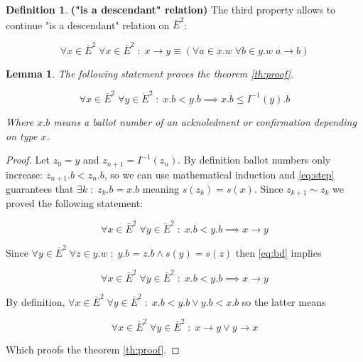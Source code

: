 \documentclass[12pt]{article}
\newtheorem{lemma}[theorem]{Lemma}
\theoremstyle{definition}
\newtheorem*{definition}{Definition}
\begin{document}
\begin{appendices}
\begin{definition}{\bf("is a descendant" relation)}
  The third property allows to continue "is a descendant" relation on $\bar{E}^2$:
  
  \begin{equation}
    \forall x \in \bar{E}^2 \; \forall x \in \bar{E}^2 \;:\; x \to y \equiv (\forall a \in x.w \; \forall b \in y.w \; a \to b)
  \end{equation}
\end{definition}

\begin{lemma}
  The following statement proves the theorem \ref{th:proof}.

  \begin{equation} \label{eq:step}
    \forall x \in \bar{E}^2 \; \forall y \in \ddot{E}^2 \;:\; x.b < y.b \implies x.b \leq I^{-1}(y).b
  \end{equation}

  Where $x.b$ means a ballot number of an acknoledment or confirmation depending on type $x$.
\end{lemma}

\begin{proof}
  Let $z_0 = y$ and $z_{n+1} = I^{-1}(z_{n})$. By definition ballot numbers only increase: $z_{n+1}.b < z_{n}.b$, so we can use mathematical induction and \ref{eq:step} guarantees that $\exists k \;:\; z_k.b = x.b$ meaning $s(z_k) = s(x)$. Since $z_{k+1} \sim z_k$ we proved the following statement:

  \begin{equation} \label{eq:bd}
    \forall x \in \bar{E}^2 \; \forall y \in \ddot{E}^2 \;:\; x.b < y.b \implies x \to y
  \end{equation}

  Since $\forall y \in \bar{E}^2 \; \forall z \in y.w \;:\; y.b=z.b \land s(y)=s(z)$ then \ref{eq:bd} implies

  \begin{equation}
    \forall x \in \bar{E}^2 \; \forall y \in \bar{E}^2 \;:\; x.b < y.b \implies x \to y
  \end{equation}

  By definition, $\forall x \in \bar{E}^2 \; \forall y \in \bar{E}^2 \;:\; x.b < y.b \lor y.b < x.b$ so the latter means

  \begin{equation}
    \forall x \in \bar{E}^2 \; \forall y \in \bar{E}^2 \;:\; x \to y \lor y \to x
  \end{equation}

  Which proofs the theorem \ref{th:proof}.
\end{proof}


\end{appendices}
\end{document}
